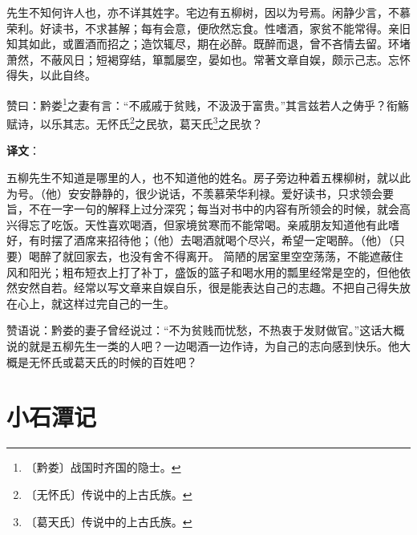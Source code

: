 \documentclass[12pt,UTF-8,openany,a4]{ctexbook}
\begin{document}
\begin{large}
    
    先生不知何许人也，亦不详其姓字。宅边有五柳树，因以为号焉。闲静少言，不慕荣利。好读书，不求甚解；每有会意，便欣然忘食。性嗜酒，家贫不能常得。亲旧知其如此，或置酒而招之；造饮辄尽，期在必醉。既醉而退，曾不吝情去留。环堵萧然，不蔽风日；短褐穿结，箪瓢屡空，晏如也。常著文章自娱，颇示己志。忘怀得失，以此自终。
    
    赞曰：黔娄\footnote{〔黔娄〕\yiwen 战国时齐国的隐士。}之妻有言：“不戚戚于贫贱，不汲汲于富贵。”其言兹若人之俦乎？衔觞赋诗，以乐其志。无怀氏\footnote{〔无怀氏〕\yiwen 传说中的上古氏族。}之民欤，葛天氏\footnote{〔葛天氏〕\yiwen 传说中的上古氏族。}之民欤？

\end{large}


\newpage

\begin{Large}
   \noindent \textbf{译文}：
\end{Large}

\vspace{1em}

\begin{large}\yiwen
    
    五柳先生不知道是哪里的人，也不知道他的姓名。房子旁边种着五棵柳树，就以此为号。（他）安安静静的，很少说话，不羡慕荣华利禄。爱好读书，只求领会要旨，不在一字一句的解释上过分深究；每当对书中的内容有所领会的时候，就会高兴得忘了吃饭。天性喜欢喝酒，但家境贫寒而不能常喝。亲戚朋友知道他有此嗜好，有时摆了酒席来招待他；（他）去喝酒就喝个尽兴，希望一定喝醉。（他）（只要）喝醉了就回家去，也没有舍不得离开。 简陋的居室里空空荡荡，不能遮蔽住风和阳光；粗布短衣上打了补丁，盛饭的篮子和喝水用的瓢里经常是空的，但他依然安然自若。经常以写文章来自娱自乐，很是能表达自己的志趣。不把自己得失放在心上，就这样过完自己的一生。
    
    赞语说：黔娄的妻子曾经说过：“不为贫贱而忧愁，不热衷于发财做官。”这话大概说的就是五柳先生一类的人吧？一边喝酒一边作诗，为自己的志向感到快乐。他大概是无怀氏或葛天氏的时候的百姓吧？
    

\end{large}



\chapter{小石潭记}
\end{document}
